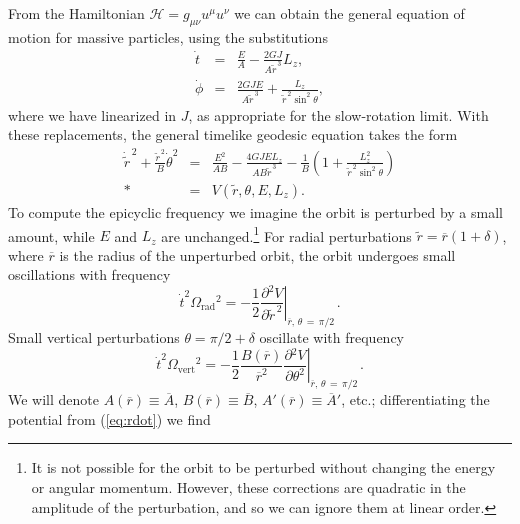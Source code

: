 \documentclass[aps,prd,amsfonts,amssymb,amsmath,nofootinbib,reprint,showpacs]{revtex4-1}
\newcommand{\eqnref}[1]{(\ref{eq:#1})}
\newcommand{\sub}[1]{\ensuremath{_\text{#1}}}
\newcommand{\partialdiff}[2]{\ensuremath{\frac{\partial {#1}}{\partial {#2}}}}
\newcommand{\recip}[1]{\ensuremath{\frac{1}{#1}}}
\begin{document}
From the Hamiltonian $\mathcal{H} = g_{\mu\nu}u^\mu u^\nu$ we can obtain the general equation of motion for massive particles, using the substitutions
\begin{eqnarray}
\dot{t} & = & \frac{E}{A} -\frac{2GJ}{A\widetilde{r}^{\,3}}L_z, \\
\dot{\phi} & = &  \frac{2GJE}{A\widetilde{r}^{\,3}} + \frac{L_z}{\widetilde{r}^{\,2} \sin^2\theta},
\end{eqnarray}
where we have linearized in $J$, as appropriate for the slow-rotation limit. With these replacements, the general timelike geodesic equation takes the form
\begin{eqnarray}
\dot{\widetilde{r}}^{\,2} + \frac{\widetilde{r}^{\,2}}{B} \dot{\theta}^2 & = & \frac{E^2}{AB} -\frac{4GJEL_z}{AB \widetilde{r}^{\,3}}- \recip{B}\left(1 + \frac{L_z^2}{\widetilde{r}^{\,2}\sin^2\theta}\right) \nonumber \\*
 & = & V(\widetilde{r},\theta,E,L_z).
\label{eq:rdot}
\end{eqnarray}
To compute the epicyclic frequency we imagine the orbit is perturbed by a small amount, while $E$ and $L_z$ are unchanged.\footnote{It is not possible for the orbit to be perturbed without changing the energy or angular momentum. However, these corrections are quadratic in the amplitude of the perturbation, and so we can ignore them at linear order.} For radial perturbations $\widetilde{r} = \overline{r}(1 + \delta)$, where $\overline{r}$ is the radius of the unperturbed orbit, the orbit undergoes small oscillations with frequency
\begin{equation}
\dot{t}^2\Omega\sub{rad}^2 = -\recip{2} \left. \partialdiff{^2 V}{\widetilde{r}^{\,2}}\right|_{\overline{r},\,\theta\,=\,\pi/2\,}.
\end{equation}
Small vertical perturbations $\theta = \pi/2 + \delta$ oscillate with frequency
\begin{equation}
\dot{t}^2\Omega\sub{vert}^2 = -\recip{2} \frac{B(\overline{r})}{\overline{r}^2} \left. \partialdiff{^2 V}{\theta^2}\right|_{\overline{r},\,\theta\,=\,\pi/2\,}.
\end{equation}
We will denote $A(\overline{r}) \equiv \overline{A}$, $B(\overline{r}) \equiv \overline{B}$, $A'(\overline{r}) \equiv \overline{A}'$, etc.; differentiating the potential from \eqnref{rdot} we find
\end{document}
